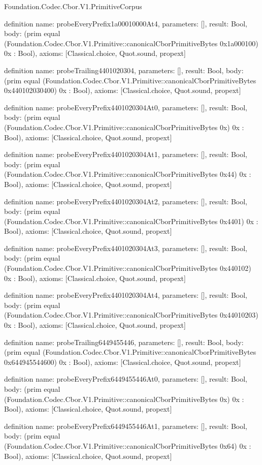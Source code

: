 \begin{lexlean}{Foundation.Codec.Cbor.V1.PrimitiveCorpus}
\begin{semanticmodule}
definition{
  name: probeEveryPrefix1a00010000At4,
  parameters: [],
  result: Bool,
  body: (prim equal (Foundation.Codec.Cbor.V1.Primitive::canonicalCborPrimitiveBytes 0x1a000100) 0x : Bool),
  axioms: [Classical.choice, Quot.sound, propext]
}

definition{
  name: probeTrailing4401020304,
  parameters: [],
  result: Bool,
  body: (prim equal (Foundation.Codec.Cbor.V1.Primitive::canonicalCborPrimitiveBytes 0x440102030400) 0x : Bool),
  axioms: [Classical.choice, Quot.sound, propext]
}

definition{
  name: probeEveryPrefix4401020304At0,
  parameters: [],
  result: Bool,
  body: (prim equal (Foundation.Codec.Cbor.V1.Primitive::canonicalCborPrimitiveBytes 0x) 0x : Bool),
  axioms: [Classical.choice, Quot.sound, propext]
}

definition{
  name: probeEveryPrefix4401020304At1,
  parameters: [],
  result: Bool,
  body: (prim equal (Foundation.Codec.Cbor.V1.Primitive::canonicalCborPrimitiveBytes 0x44) 0x : Bool),
  axioms: [Classical.choice, Quot.sound, propext]
}

definition{
  name: probeEveryPrefix4401020304At2,
  parameters: [],
  result: Bool,
  body: (prim equal (Foundation.Codec.Cbor.V1.Primitive::canonicalCborPrimitiveBytes 0x4401) 0x : Bool),
  axioms: [Classical.choice, Quot.sound, propext]
}

definition{
  name: probeEveryPrefix4401020304At3,
  parameters: [],
  result: Bool,
  body: (prim equal (Foundation.Codec.Cbor.V1.Primitive::canonicalCborPrimitiveBytes 0x440102) 0x : Bool),
  axioms: [Classical.choice, Quot.sound, propext]
}

definition{
  name: probeEveryPrefix4401020304At4,
  parameters: [],
  result: Bool,
  body: (prim equal (Foundation.Codec.Cbor.V1.Primitive::canonicalCborPrimitiveBytes 0x44010203) 0x : Bool),
  axioms: [Classical.choice, Quot.sound, propext]
}

definition{
  name: probeTrailing6449455446,
  parameters: [],
  result: Bool,
  body: (prim equal (Foundation.Codec.Cbor.V1.Primitive::canonicalCborPrimitiveBytes 0x644945544600) 0x : Bool),
  axioms: [Classical.choice, Quot.sound, propext]
}

definition{
  name: probeEveryPrefix6449455446At0,
  parameters: [],
  result: Bool,
  body: (prim equal (Foundation.Codec.Cbor.V1.Primitive::canonicalCborPrimitiveBytes 0x) 0x : Bool),
  axioms: [Classical.choice, Quot.sound, propext]
}

definition{
  name: probeEveryPrefix6449455446At1,
  parameters: [],
  result: Bool,
  body: (prim equal (Foundation.Codec.Cbor.V1.Primitive::canonicalCborPrimitiveBytes 0x64) 0x : Bool),
  axioms: [Classical.choice, Quot.sound, propext]
}


\end{semanticmodule}
\end{lexlean}
